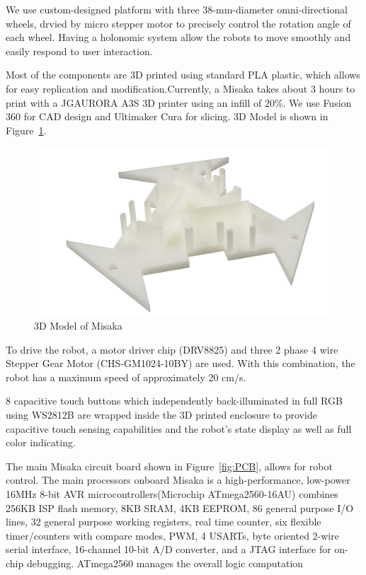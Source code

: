 \documentclass[conference]{IEEEtran}
\begin{document}
We use custom-designed platform with three 38-mm-diameter omni-directional wheels, drvied by micro stepper motor to precisely control the rotation angle of each wheel. Having a holonomic system allow the robots to move smoothly and easily respond to user interaction.

Most of the components are 3D printed using standard PLA plastic, which allows for easy replication and modification.Currently, a Misaka takes about 3 hours to print with a JGAURORA A3S 3D printer using an infill of 20\%. We use Fusion 360 for CAD design and Ultimaker Cura for slicing. 3D Model is shown in Figure~\ref{fig:3DModel}.

\begin{figure}[htbp]
    \centering
    \includegraphics[width=\columnwidth]{3DModel.png}
    \caption{3D Model of Misaka}
    \label{fig:3DModel}
\end{figure}

To drive the robot, a motor driver chip (DRV8825) and three 2 phase 4 wire Stepper Gear Motor (CHS-GM1024-10BY) are used. With this combination, the robot has a maximum speed of approximately 20 cm/s.

8 capacitive touch buttons which independently back-illuminated in full RGB using WS2812B are wrapped inside the 3D printed enclosure to provide capacitive touch sensing capabilities and the robot’s state display as well as full color indicating.

The main Misaka circuit board shown in Figure~\ref{fig:PCB}, allows for robot control. The main processors onboard Misaka is a high-performance, low-power 16MHz 8-bit AVR microcontrollers(Microchip ATmega2560-16AU) combines 256KB ISP flash memory, 8KB SRAM, 4KB EEPROM, 86 general purpose I/O lines, 32 general purpose working registers, real time counter, six flexible timer/counters with compare modes, PWM, 4 USARTs, byte oriented 2-wire serial interface, 16-channel 10-bit A/D converter, and a JTAG interface for on-chip debugging. ATmega2560 manages the overall logic computation
\end{document}
